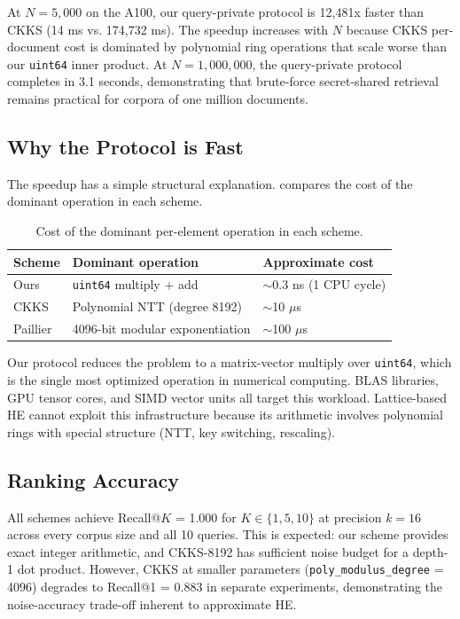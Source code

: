 \documentclass[11pt]{article}
\begin{document}
At $N = 5{,}000$ on the A100, our query-private protocol is 12{,}481x faster than CKKS (14 ms vs. 174{,}732 ms). The speedup increases with $N$ because CKKS per-document cost is dominated by polynomial ring operations that scale worse than our \texttt{uint64} inner product. At $N = 1{,}000{,}000$, the query-private protocol completes in 3.1 seconds, demonstrating that brute-force secret-shared retrieval remains practical for corpora of one million documents.

\subsection{Why the Protocol is Fast}

The speedup has a simple structural explanation.  compares the cost of the dominant operation in each scheme.

\begin{table}[h]
\centering
\caption{Cost of the dominant per-element operation in each scheme.}
\label{tab:cost}
\begin{tabular}{lll}
\toprule
Scheme & Dominant operation & Approximate cost \\
\midrule
Ours & \texttt{uint64} multiply + add & $\sim$0.3 ns (1 CPU cycle) \\
CKKS & Polynomial NTT (degree 8192) & $\sim$10 $\mu$s \\
Paillier & 4096-bit modular exponentiation & $\sim$100 $\mu$s \\
\bottomrule
\end{tabular}
\end{table}

Our protocol reduces the problem to a matrix-vector multiply over \texttt{uint64}, which is the single most optimized operation in numerical computing. BLAS libraries, GPU tensor cores, and SIMD vector units all target this workload. Lattice-based HE cannot exploit this infrastructure because its arithmetic involves polynomial rings with special structure (NTT, key switching, rescaling).

\subsection{Ranking Accuracy}

All schemes achieve Recall@$K$ = 1.000 for $K \in \{1, 5, 10\}$ at precision $k = 16$ across every corpus size and all 10 queries. This is expected: our scheme provides exact integer arithmetic, and CKKS-8192 has sufficient noise budget for a depth-1 dot product. However, CKKS at smaller parameters (\texttt{poly\_modulus\_degree} = 4096) degrades to Recall@1 = 0.883 in separate experiments, demonstrating the noise-accuracy trade-off inherent to approximate HE.
\end{document}
